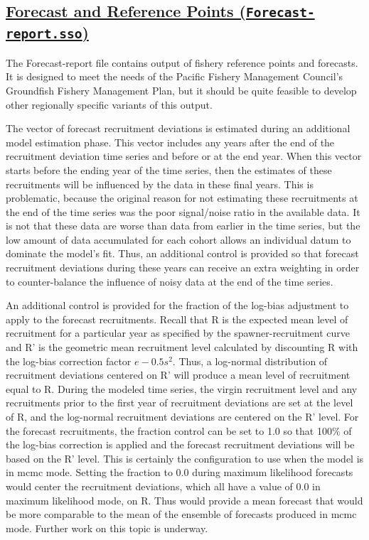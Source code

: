\hypertarget{ForecastRefPoints}{}
\subsection[Forecast and Reference Points (\texttt{Forecast-report.sso})]{\protect\hyperlink{ForecastRefPoints}{Forecast and Reference Points (\texttt{Forecast-report.sso})}}
The Forecast-report file contains output of fishery reference points and forecasts. It is designed to meet the needs of the Pacific Fishery Management Council's Groundfish Fishery Management Plan, but it should be quite feasible to develop other regionally specific variants of this output.

The vector of forecast recruitment deviations is estimated during an additional model estimation phase. This vector includes any years after the end of the recruitment deviation time series and before or at the end year. When this vector starts before the ending year of the time series, then the estimates of these recruitments will be influenced by the data in these final years. This is problematic, because the original reason for not estimating these recruitments at the end of the time series was the poor signal/noise ratio in the available data. It is not that these data are worse than data from earlier in the time series, but the low amount of data accumulated for each cohort allows an individual datum to dominate the model's fit. Thus, an additional control is provided so that forecast recruitment deviations during these years can receive an extra weighting in order to counter-balance the influence of noisy data at the end of the time series.

An additional control is provided for the fraction of the log-bias adjustment to apply to the forecast recruitments. Recall that R is the expected mean level of recruitment for a particular year as specified by the spawner-recruitment curve and R' is the geometric mean recruitment level calculated by discounting R with the log-bias correction factor $e-0.5s^2$. Thus, a log-normal distribution of recruitment deviations centered on R' will produce a mean level of recruitment equal to R. During the modeled time series, the virgin recruitment level and any recruitments prior to the first year of recruitment deviations are set at the level of R, and the log-normal recruitment deviations are centered on the R' level. For the forecast recruitments, the fraction control can be set to 1.0 so that 100\% of the log-bias correction is applied and the forecast recruitment deviations will be based on the R' level. This is certainly the configuration to use when the model is in \gls{mcmc} mode. Setting the fraction to 0.0 during maximum likelihood forecasts would center the recruitment deviations, which all have a value of 0.0 in maximum likelihood mode, on R. Thus would provide a mean forecast that would be more comparable to the mean of the ensemble of forecasts produced in \gls{mcmc} mode. Further work on this topic is underway.

